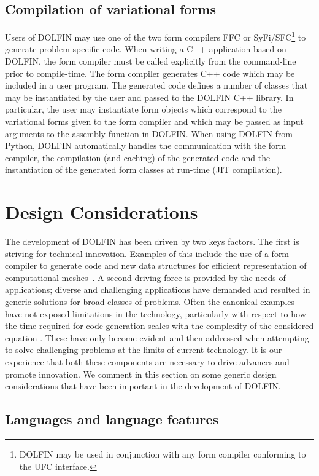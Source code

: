 \documentclass[acmtoms]{acmtrans2m}
\newcommand{\dolfin}{DOLFIN}
\begin{document}
\subsection{Compilation of variational forms}

Users of \dolfin{} may use one of the two form compilers FFC or
SyFi/SFC\footnote{\dolfin{} may be used in conjunction with any form
  compiler conforming to the UFC interface.} to generate
problem-specific code. When writing a C++ application based on
\dolfin{}, the form compiler must be called explicitly from the
command-line prior to compile-time. The form compiler generates C++
code which may be included in a user program. The generated code
defines a number of classes that may be instantiated by the user and
passed to the \dolfin{} C++ library. In particular, the user may
instantiate form objects which correspond to the variational forms
given to the form compiler and which may be passed as input arguments
to the assembly function in \dolfin{}. When using \dolfin{} from
Python, \dolfin{} automatically handles the communication with the
form compiler, the compilation (and caching) of the generated code and the
instantiation of the generated form classes at run-time (JIT
compilation).

\section{Design Considerations}
\label{sec:design}

The development of \dolfin{} has been driven by two keys
factors. The first is striving for technical innovation. Examples of
this include the use of a form compiler to generate code and new data
structures for efficient representation of computational
meshes~\cite{logg:2008}. A second driving force is provided by the
needs of applications; diverse and challenging applications have
demanded and resulted in generic solutions for broad classes of
problems. Often the canonical examples have not exposed limitations in
the technology, particularly with respect to how the time required
for code generation scales with the complexity of the considered
equation \cite{oelgaard:2009}.
These have only become evident and then addressed when
attempting to solve challenging problems at the limits of current
technology. It is our experience that both these components are
necessary to drive advances and promote innovation.
We comment in this section on some generic design considerations that have been
important in the development of \dolfin{}.
\subsection{Languages and language features}
\label{sec:languages}
\end{document}
